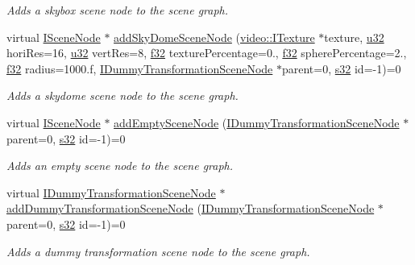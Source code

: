 \begin{DoxyCompactItemize}
\begin{DoxyCompactList}\small\item\em Adds a skybox scene node to the scene graph. \end{DoxyCompactList}\item 
virtual \hyperlink{classirr_1_1scene_1_1ISceneNode}{I\+Scene\+Node} $\ast$ \hyperlink{classirr_1_1scene_1_1ISceneManager_a30ea6d8b624064781a6ffd6a1841b525}{add\+Sky\+Dome\+Scene\+Node} (\hyperlink{classirr_1_1video_1_1ITexture}{video\+::\+I\+Texture} $\ast$texture, \hyperlink{namespaceirr_a0416a53257075833e7002efd0a18e804}{u32} hori\+Res=16, \hyperlink{namespaceirr_a0416a53257075833e7002efd0a18e804}{u32} vert\+Res=8, \hyperlink{namespaceirr_a0277be98d67dc26ff93b1a6a1d086b07}{f32} texture\+Percentage=0., \hyperlink{namespaceirr_a0277be98d67dc26ff93b1a6a1d086b07}{f32} sphere\+Percentage=2., \hyperlink{namespaceirr_a0277be98d67dc26ff93b1a6a1d086b07}{f32} radius=1000.f, \hyperlink{classirr_1_1scene_1_1IDummyTransformationSceneNode}{I\+Dummy\+Transformation\+Scene\+Node} $\ast$parent=0, \hyperlink{namespaceirr_ac66849b7a6ed16e30ebede579f9b47c6}{s32} id=-\/1)=0
\begin{DoxyCompactList}\small\item\em Adds a skydome scene node to the scene graph. \end{DoxyCompactList}\item 
virtual \hyperlink{classirr_1_1scene_1_1ISceneNode}{I\+Scene\+Node} $\ast$ \hyperlink{classirr_1_1scene_1_1ISceneManager_aebb834a110b49b0306c9220dee900b66}{add\+Empty\+Scene\+Node} (\hyperlink{classirr_1_1scene_1_1IDummyTransformationSceneNode}{I\+Dummy\+Transformation\+Scene\+Node} $\ast$parent=0, \hyperlink{namespaceirr_ac66849b7a6ed16e30ebede579f9b47c6}{s32} id=-\/1)=0
\begin{DoxyCompactList}\small\item\em Adds an empty scene node to the scene graph. \end{DoxyCompactList}\item 
virtual \hyperlink{classirr_1_1scene_1_1IDummyTransformationSceneNode}{I\+Dummy\+Transformation\+Scene\+Node} $\ast$ \hyperlink{classirr_1_1scene_1_1ISceneManager_ae411fd946f586aaed158364640cef58c}{add\+Dummy\+Transformation\+Scene\+Node} (\hyperlink{classirr_1_1scene_1_1IDummyTransformationSceneNode}{I\+Dummy\+Transformation\+Scene\+Node} $\ast$parent=0, \hyperlink{namespaceirr_ac66849b7a6ed16e30ebede579f9b47c6}{s32} id=-\/1)=0
\begin{DoxyCompactList}\small\item\em Adds a dummy transformation scene node to the scene graph. \end{DoxyCompactList}\item 

\end{DoxyCompactItemize}

